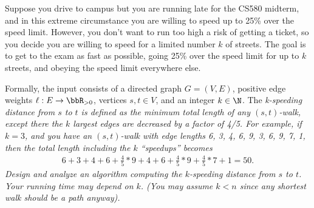 \documentclass{article}
\begin{document}
\setcounter{exercise}{2}
\begin{exercise}
  Suppose you drive to campus but you are running late for the CS580 midterm, and in this extreme circumstance you are willing to speed up to 25\% over the speed limit.
  However, you don't want to run too high a risk of getting a ticket, so you decide you are willing to speed for a limited number \( k \) of streets.
  The goal is to get to the exam as fast as possible, going 25\% over the speed limit for up to \( k \) streets, and obeying the speed limit everywhere else.

  Formally, the input consists of a directed graph \( G = (V, E) \), positive edge weights \( \ell:E\to \bbR_{>0} \), vertices \( s,t\in V \), and an integer \( k \in \N \).
  The \it{k-speeding distance} from \( s \) to \( t \) is defined as the minimum total length of any \( (s, t) \)-walk, except there the \( k \) largest edges are decreased by a factor of 4/5.
  For example, if \( k = 3 \), and you have an \( (s, t) \)-walk with edge lengths 6, 3, 4, 6, 9, 3, 6, 9, 7, 1, then the total length including the \( k \) ``speedups'' becomes \begin{align*}
    6+3+4+6+\frac{4}{5}*9+4+6+\frac{4}{5}*9+\frac{4}{5}*7+1=50.
  \end{align*}
  Design and analyze an algorithm computing the \( k \)-speeding distance from \( s \) to \( t \).
  Your running time may depend on \( k \). (You may assume \( k < n \) since any shortest walk should be a path anyway).
\end{exercise}
\end{document}
